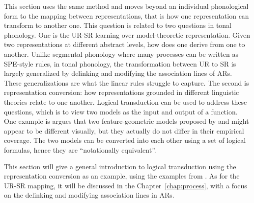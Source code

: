 This section uses the same method and moves beyond an individual 
phonological form to the mapping between representations, that
is how one representation can transform to another one. This 
question is related to two questions in tonal phonology. One is the UR-SR 
learning over model-theoretic representation. Given two representations at different 
abstract levels, how does one derive from one to another. Unlike segmental
phonology where many processes can be written as SPE-style rules,
in tonal phonology, the transformation between UR to SR is largely
generalized by delinking and modifying the association lines of ARs.
These generalizations are what the linear rules struggle to capture.
The second is representation conversion: 
how representations grounded  in different linguistic theories relate to one another. 
Logical transduction can be used to address these questions, which is to 
view two models as the input and output of a function. One example is  
\citet{oakdenNotationalEquivalenceTonal2020} argues that two feature-geometric 
models proposed by \citet{bao1999structure} and \citet{yip1989contour} 
might appear to be different visually, but they actually do not differ in 
their empirical coverage. The two models can be converted into each other
using a set of logical formulas, hence they are ``notationally equivalent''.


This section will give a general introduction to logical transduction using
the representation conversion as an example, using the examples from
\citet{oakdenNotationalEquivalenceTonal2020}. As for the UR-SR mapping, it 
will be discussed in the Chapter~\ref{chap:process}, with a focus on the 
delinking and modifying association lines in ARs.


